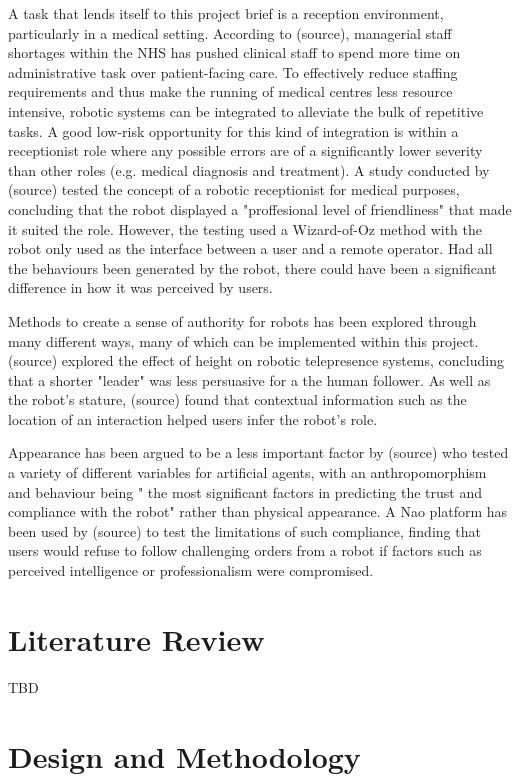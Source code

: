 \documentclass[conference]{IEEEtran}
\begin{document}
A task that lends itself to this project brief is a reception environment, particularly in a medical setting. According to 
(source), managerial staff shortages within the NHS has pushed clinical staff to spend more time on administrative task over 
patient-facing care. To effectively reduce staffing requirements and thus make the running of medical centres less resource intensive, robotic 
systems can be integrated to alleviate the bulk of repetitive tasks. A good low-risk opportunity for this kind of integration is within a 
receptionist role where any possible errors are of a significantly lower severity than other roles (e.g. medical diagnosis and treatment).
A study conducted by (source) tested the concept of a robotic receptionist for medical purposes, concluding that the robot displayed a 
"proffesional level of friendliness" that made it suited the role. However, the testing used a Wizard-of-Oz method with the robot only 
used as the interface between a user and a remote operator. Had all the behaviours been generated by the robot, there could have been 
a significant difference in how it was perceived by users.

Methods to create a sense of authority for robots has been explored through many different ways, many of which can be implemented within 
this project. (source) explored the effect of height on robotic telepresence systems, concluding that a shorter "leader" was less persuasive 
for a the human follower. As well as the robot's stature, (source) found that contextual information such as the location of an interaction 
helped users infer the robot’s role.

Appearance has been argued to be a less important factor by (source) who tested a variety of different variables for artificial agents, with an 
anthropomorphism and behaviour being " the most significant factors in predicting the trust and compliance with the robot" rather 
than physical appearance. A Nao platform has been used by (source) to test the limitations of such compliance, finding that users would 
refuse to follow challenging orders from a robot if factors such as perceived intelligence or professionalism were compromised.


\section{Literature Review}

TBD

\section{Design and Methodology}
\end{document}
